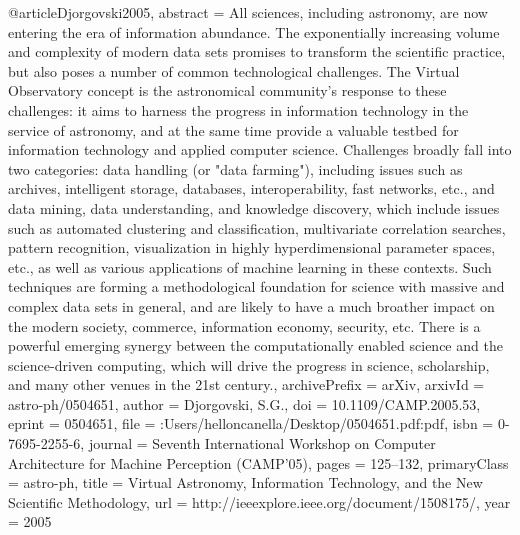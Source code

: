 @article{Djorgovski2005,
abstract = {All sciences, including astronomy, are now entering the era of information abundance. The exponentially increasing volume and complexity of modern data sets promises to transform the scientific practice, but also poses a number of common technological challenges. The Virtual Observatory concept is the astronomical community's response to these challenges: it aims to harness the progress in information technology in the service of astronomy, and at the same time provide a valuable testbed for information technology and applied computer science. Challenges broadly fall into two categories: data handling (or "data farming"), including issues such as archives, intelligent storage, databases, interoperability, fast networks, etc., and data mining, data understanding, and knowledge discovery, which include issues such as automated clustering and classification, multivariate correlation searches, pattern recognition, visualization in highly hyperdimensional parameter spaces, etc., as well as various applications of machine learning in these contexts. Such techniques are forming a methodological foundation for science with massive and complex data sets in general, and are likely to have a much broather impact on the modern society, commerce, information economy, security, etc. There is a powerful emerging synergy between the computationally enabled science and the science-driven computing, which will drive the progress in science, scholarship, and many other venues in the 21st century.},
archivePrefix = {arXiv},
arxivId = {astro-ph/0504651},
author = {Djorgovski, S.G.},
doi = {10.1109/CAMP.2005.53},
eprint = {0504651},
file = {:Users/helloncanella/Desktop/0504651.pdf:pdf},
isbn = {0-7695-2255-6},
journal = {Seventh International Workshop on Computer Architecture for Machine Perception (CAMP'05)},
pages = {125--132},
primaryClass = {astro-ph},
title = {{Virtual Astronomy, Information Technology, and the New Scientific Methodology}},
url = {http://ieeexplore.ieee.org/document/1508175/},
year = {2005}
}

